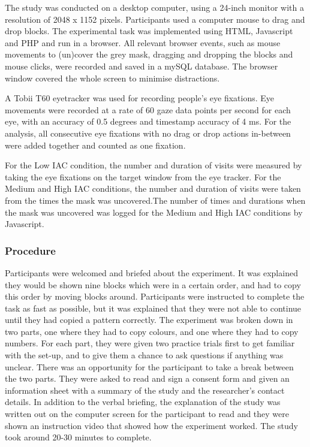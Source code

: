 \documentclass[11pt,oneside]{report}
\begin{document}
The study was conducted on a desktop computer, using a 24-inch monitor with a resolution of 2048 x 1152 pixels. Participants used a computer mouse to drag and drop blocks. The experimental task was implemented using HTML, Javascript and PHP and run in a browser.  All relevant browser events, such as mouse movements to (un)cover the grey mask, dragging and dropping the blocks and mouse clicks, were recorded and saved in a mySQL database. The browser window covered the whole screen to minimise distractions.

A Tobii T60 eyetracker was used for recording people's eye fixations. Eye movements were recorded at a rate of 60 gaze data points per second for each eye, with an accuracy of 0.5 degrees and timestamp accuracy of 4 ms. For the analysis, all consecutive eye fixations with no drag or drop actions in-between were added together and counted as one fixation.

For the Low IAC condition, the number and duration of visits were measured by taking the eye fixations on the target window from the eye tracker. For the Medium and High IAC conditions, the number and duration of visits were taken from the times the mask was uncovered.The number of times and durations when the mask was uncovered was logged for the Medium and High IAC conditions by Javascript.

\subsubsection{Procedure}
Participants were welcomed and briefed about the experiment. It was explained they would be shown nine blocks which were in a certain order, and had to copy this order by moving blocks around. Participants were instructed to complete the task as fast as possible, but it was explained that they were not able to continue until they had copied a pattern correctly. 
The experiment was broken down in two parts, one where they had to copy colours, and one where they had to copy numbers. For each part, they were given two practice trials first to get familiar with the set-up, and to give them a chance to ask questions if anything was unclear. There was an opportunity for the participant to take a break between the two parts. 
They were asked to read and sign a consent form and given an information sheet with a summary of the study and the researcher's contact details. In addition to the verbal briefing, the explanation of the study was written out on the computer screen for the participant to read and they were shown an instruction video that showed how the experiment worked. The study took around 20-30 minutes to complete.
\end{document}
